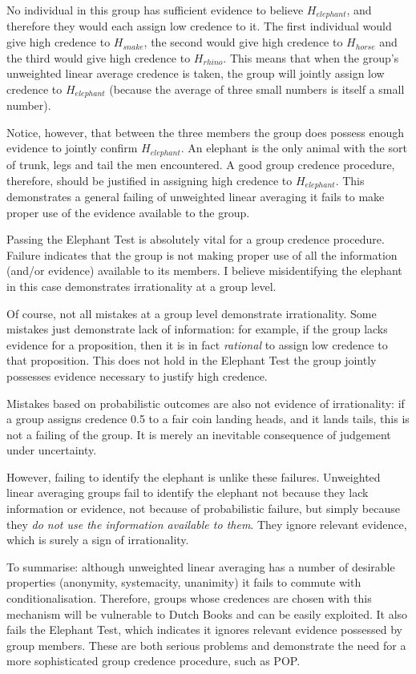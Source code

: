 \documentclass{article}
\begin{document}
No individual in this group has sufficient evidence to believe \(H_{elephant}\), and therefore they would each assign low credence to it. The first individual would give high credence to \(H_{snake}\), the second would give high credence to \(H_{horse}\) and the third would give high credence to \(H_{rhino}\). This means that when the group's unweighted linear average credence is taken, the group will jointly assign low credence to \(H_{elephant}\) (because the average of three small numbers is itself a small number). 

Notice, however, that between the three members the group does possess enough evidence to jointly confirm \(H_{elephant}\). An elephant is the only animal with the sort of trunk, legs and tail the men encountered. A good group credence procedure, therefore, should be justified in assigning high credence to \(H_{elephant}\). This demonstrates a general failing of unweighted linear averaging \textemdash{} it fails to make proper use of the evidence available to the group. 

Passing the Elephant Test is absolutely vital for a group credence procedure. Failure indicates that the group is not making proper use of all the information (and/or evidence) available to its members. I believe misidentifying the elephant in this case demonstrates irrationality at a group level. 

Of course, not all mistakes at a group level demonstrate irrationality. Some mistakes just demonstrate lack of information: for example, if the group lacks evidence for a proposition, then it is in fact \textit{rational} to assign low credence to that proposition. This does not hold in the Elephant Test \textemdash{} the group jointly possesses evidence necessary to justify high credence. 

Mistakes based on probabilistic outcomes are also not evidence of irrationality: if a group assigns credence 0.5 to a fair coin landing heads, and it lands tails, this is not a failing of the group. It is merely an inevitable consequence of judgement under uncertainty. 

However, failing to identify the elephant is unlike these failures. Unweighted linear averaging groups fail to identify the elephant not because they lack information or evidence, not because of probabilistic failure, but simply because they \textit{do not use the information available to them}. They ignore relevant evidence, which is surely a sign of irrationality.

To summarise: although unweighted linear averaging has a number of desirable properties (anonymity, systemacity, unanimity) it fails to commute with conditionalisation. Therefore, groups whose credences are chosen with this mechanism will be vulnerable to Dutch Books and can be easily exploited. It also fails the Elephant Test, which indicates it ignores relevant evidence possessed by group members. These are both serious problems and demonstrate the need for a more sophisticated group credence procedure, such as POP.
\end{document}
